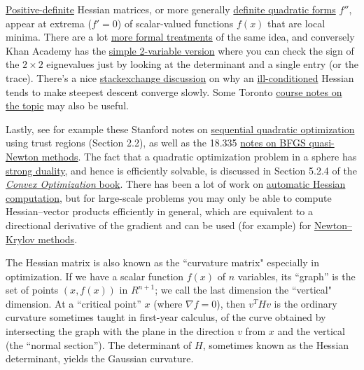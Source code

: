 \href{https://en.wikipedia.org/wiki/Definite_matrix}{Positive-definite} Hessian matrices, or more generally \href{https://en.wikipedia.org/wiki/Definite_quadratic_form}{definite quadratic forms} $f''$, appear at extrema ($f' =0$) of scalar-valued functions $f(x)$ that are local minima. There are a lot \href{http://www.columbia.edu/~md3405/Unconstrained_Optimization.pdf}{more formal treatments} of the same idea, and conversely Khan Academy has the \href{https://www.khanacademy.org/math/multivariable-calculus/applications-of-multivariable-derivatives/optimizing-multivariable-functions/a/second-partial-derivative-test}{simple 2-variable version} where you can check the sign of the $2\times 2$ eignevalues just by looking at the determinant and a single entry (or the trace). There's a nice \href{https://math.stackexchange.com/questions/2285282/relating-condition-number-of-hessian-to-the-rate-of-convergence}{stackexchange discussion} on why an \href{https://nhigham.com/2020/03/19/what-is-a-condition-number/}{ill-conditioned} Hessian tends to make steepest descent converge slowly. Some Toronto \href{https://www.cs.toronto.edu/~rgrosse/courses/csc421_2019/slides/lec07.pdf}{course notes on the topic} may also be useful.

Lastly, see for example these Stanford notes on \href{https://web.stanford.edu/class/ee364b/lectures/seq_notes.pdf}{sequential quadratic optimization} using trust regions (Section 2.2), as well as the 18.335 \href{https://github.com/mitmath/18335/blob/spring21/notes/BFGS.pdf}{notes on BFGS quasi-Newton methods}. The fact that a quadratic optimization problem in a sphere has \href{https://en.wikipedia.org/wiki/Strong_duality}{strong duality}, and hence is efficiently solvable, is discussed in Section 5.2.4 of the \href{https://web.stanford.edu/~boyd/cvxbook/}{\textit{Convex Optimization} book}. There has been a lot of work on \href{https://en.wikipedia.org/wiki/Hessian_automatic_differentiation}{automatic Hessian computation}, but for large-scale problems you may only be able to compute Hessian--vector products efficiently in general, which are equivalent to a directional derivative of the gradient and can be used (for example) for \href{https://en.wikipedia.org/wiki/Newton%E2%80%93Krylov_method}{Newton--Krylov methods}.

The Hessian matrix is also known as the ``curvature matrix"
especially in optimization. If we have a scalar function $f(x)$ of $n$ variables, its ``graph'' is the set of points $(x,f(x))$ in $R^{n+1}$; we call the last dimension the ``vertical" dimension. At a ``critical point'' $x$ (where $\nabla f = 0$), then $v^T H v$  is the ordinary curvature sometimes taught in first-year calculus, of the curve obtained by intersecting the graph with the plane in the direction $v$ from $x$ and the vertical (the ``normal section''). The determinant of $H$, sometimes known as the Hessian determinant, yields the Gaussian curvature.

